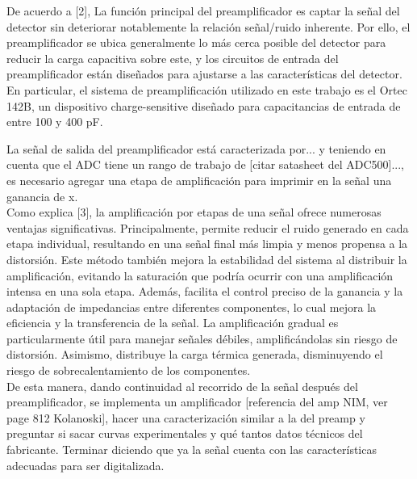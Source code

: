 \documentclass[]{book}
\begin{document}

\noindent De acuerdo a [2], La función principal del preamplificador es captar la señal del detector sin deteriorar notablemente la relación señal/ruido inherente. Por ello, el preamplificador se ubica generalmente lo más cerca posible del detector para reducir la carga capacitiva sobre este, y los circuitos de entrada del preamplificador están diseñados para ajustarse a las características del detector. En particular, el sistema de preamplificación utilizado en este trabajo es el Ortec 142B, un dispositivo charge-sensitive diseñado para capacitancias de entrada de entre 100 y 400 pF. %

La señal de salida del preamplificador está caracterizada por... y teniendo en cuenta que el ADC tiene un rango de trabajo de [citar satasheet del ADC500]..., es necesario agregar una etapa de amplificación para imprimir en la señal una ganancia de x.\\

\noindent Como explica [3], la amplificación por etapas de una señal ofrece numerosas ventajas significativas. Principalmente, permite reducir el ruido generado en cada etapa individual, resultando en una señal final más limpia y menos propensa a la distorsión. Este método también mejora la estabilidad del sistema al distribuir la amplificación, evitando la saturación que podría ocurrir con una amplificación intensa en una sola etapa. Además, facilita el control preciso de la ganancia y la adaptación de impedancias entre diferentes componentes, lo cual mejora la eficiencia y la transferencia de la señal. La amplificación gradual es particularmente útil para manejar señales débiles, amplificándolas sin riesgo de distorsión. Asimismo, distribuye la carga térmica generada, disminuyendo el riesgo de sobrecalentamiento de los componentes. \\


\noindent De esta manera, dando continuidad al recorrido de la señal después del preamplificador, se implementa un amplificador [referencia del amp NIM, ver page 812 Kolanoski], hacer una caracterización similar a la del preamp y preguntar si sacar curvas experimentales y qué tantos datos técnicos del fabricante. Terminar diciendo que ya la señal cuenta con las características adecuadas para ser digitalizada. \\
\end{document}
